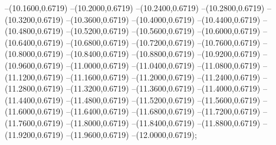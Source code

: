 {	--(10.1600,0.6719)
	--(10.2000,0.6719)
	--(10.2400,0.6719)
	--(10.2800,0.6719)
	--(10.3200,0.6719)
	--(10.3600,0.6719)
	--(10.4000,0.6719)
	--(10.4400,0.6719)
	--(10.4800,0.6719)
	--(10.5200,0.6719)
	--(10.5600,0.6719)
	--(10.6000,0.6719)
	--(10.6400,0.6719)
	--(10.6800,0.6719)
	--(10.7200,0.6719)
	--(10.7600,0.6719)
	--(10.8000,0.6719)
	--(10.8400,0.6719)
	--(10.8800,0.6719)
	--(10.9200,0.6719)
	--(10.9600,0.6719)
	--(11.0000,0.6719)
	--(11.0400,0.6719)
	--(11.0800,0.6719)
	--(11.1200,0.6719)
	--(11.1600,0.6719)
	--(11.2000,0.6719)
	--(11.2400,0.6719)
	--(11.2800,0.6719)
	--(11.3200,0.6719)
	--(11.3600,0.6719)
	--(11.4000,0.6719)
	--(11.4400,0.6719)
	--(11.4800,0.6719)
	--(11.5200,0.6719)
	--(11.5600,0.6719)
	--(11.6000,0.6719)
	--(11.6400,0.6719)
	--(11.6800,0.6719)
	--(11.7200,0.6719)
	--(11.7600,0.6719)
	--(11.8000,0.6719)
	--(11.8400,0.6719)
	--(11.8800,0.6719)
	--(11.9200,0.6719)
	--(11.9600,0.6719)
	--(12.0000,0.6719);
}
